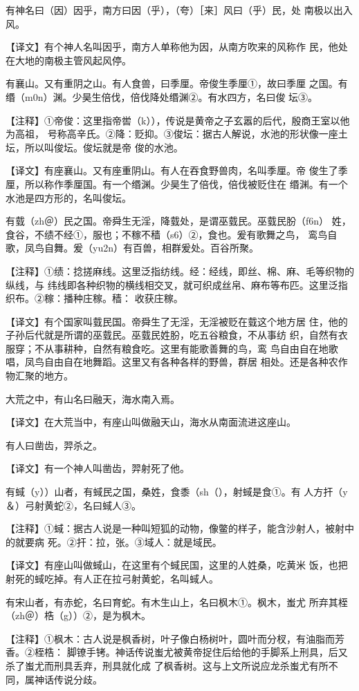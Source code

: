 \documentclass[a4paper,12pt,UTF8,twoside]{ctexbook}
\begin{document}
有神名曰（因）因乎，南方曰因（乎），（夸）［来］风曰（乎）民，处 南极以出入风。

【译文】有个神人名叫因乎，南方人单称他为因，从南方吹来的风称作 民，他处在大地的南极主管风起风停。

有襄山。又有重阴之山。有人食兽，曰季厘。帝俊生季厘①，故曰季厘 之国。有缗（m0n）渊。少昊生倍伐，倍伐降处缗渊②。有水四方，名曰俊 坛③。

【注释】①帝俊：这里指帝喾（k）），传说是黄帝之子玄嚣的后代，殷商王室以他为高祖， 号称高辛氏。②降：贬抑。③俊坛：据古人解说，水池的形状像一座土坛，所以叫俊坛。俊坛就是帝 俊的水池。

【译文】有座襄山。又有座重阴山。有人在吞食野兽肉，名叫季厘。帝 俊生了季厘，所以称作季厘国。有一个缗渊。少昊生了倍伐，倍伐被贬住在 缗渊。有一个水池是四方形的，名叫俊坛。

有臷（zh＠）民之国。帝舜生无淫，降臷处，是谓巫臷民。巫臷民朌（f6n） 姓，食谷，不绩不经①，服也；不稼不穑（s6）②，食也。爰有歌舞之鸟， 鸾鸟自歌，凤鸟自舞。爰（yu2n）有百兽，相群爰处。百谷所聚。

【注释】①绩：捻搓麻线。这里泛指纺线。经：经线，即丝、棉、麻、毛等织物的纵线，与 纬线即各种织物的横线相交叉，就可织成丝帛、麻布等布匹。这里泛指织布。②稼：播种庄稼。穑： 收获庄稼。

【译文】有个国家叫臷民国。帝舜生了无淫，无淫被贬在臷这个地方居 住，他的子孙后代就是所谓的巫臷民。巫臷民姓朌，吃五谷粮食，不从事纺 织，自然有衣服穿；不从事耕种，自然有粮食吃。这里有能歌善舞的鸟，鸾 鸟自由自在地歌唱，凤鸟自由自在地舞蹈。这里又有各种各样的野兽，群居 相处。还是各种农作物汇聚的地方。

大荒之中，有山名曰融天，海水南入焉。

【译文】在大荒当中，有座山叫做融天山，海水从南面流进这座山。

有人曰凿齿，羿杀之。

【译文】有一个神人叫凿齿，羿射死了他。

有蜮（y））山者，有蜮民之国，桑姓，食黍（sh（），射蜮是食①。有 人方扞（y＆）弓射黄蛇②，名曰蜮人③。

【注释】①蜮：据古人说是一种叫短狐的动物，像鳖的样子，能含沙射人，被射中的就要病 死。②扞：拉，张。③域人：就是域民。

【译文】有座山叫做蜮山，在这里有个蜮民国，这里的人姓桑，吃黄米 饭，也把射死的蜮吃掉。有人正在拉弓射黄蛇，名叫蜮人。

有宋山者，有赤蛇，名曰育蛇。有木生山上，名曰枫木①。枫木，蚩尤 所弃其桎（zh＠）梏（g））②，是为枫木。

【注释】①枫木：古人说是枫香树，叶子像白杨树叶，圆叶而分杈，有油脂而芳香。②桎梏： 脚镣手铐。神话传说蚩尤被黄帝捉住后给他的手脚系上刑具，后又杀了蚩尤而刑具丢弃，刑具就化成 了枫香树。这与上文所说应龙杀蚩尤有所不同，属神话传说分歧。
\end{document}
